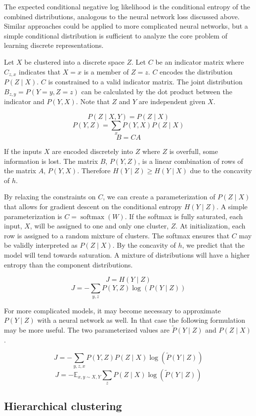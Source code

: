 \documentclass[11pt,letterpaper]{article}
\begin{document}
The expected conditional negative log likelihood is the conditional entropy of the combined distributions, analogous to the neural network loss discussed above. Similar approaches could be applied to more complicated neural networks, but a simple conditional distribution is sufficient to analyze the core problem of learning discrete representations.

Let $X$ be clustered into a discrete space $Z$. Let $C$ be an indicator matrix where $C_{z,x}$ indicates that $X=x$ is a member of $Z=z$. $C$ encodes the distribution $P(Z \mid X)$. $C$ is constrained to a valid indicator matrix. The joint distribution $B_{z,y}=P(Y=y,Z=z)$ can be calculated by the dot product between the indicator and $P(Y,X)$. Note that $Z$ and $Y$ are independent given $X$.

$$P(Z \mid X,Y) = P(Z \mid X)$$
$$P(Y,Z) = \sum_x P(Y,X) P(Z \mid X)$$
$$B = C A $$ 

If the inputs $X$ are encoded discretely into $Z$ where $Z$ is overfull, some information is lost.  The matrix $B$, $P(Y,Z)$, is a linear combination of rows of the matrix $A$, $P(Y,X)$. Therefore $H(Y \mid Z) \ge H(Y \mid X)$ due to the concavity of $h$. 

By relaxing the constraints on $C$, we can create a parameterization of $P(Z \mid X)$ that allows for gradient descent on the conditional entropy $H(Y\mid Z)$. A simple parameterization
is $C=\operatorname{softmax}(W)$. If the softmax is fully saturated, each input, $X$, will be assigned to one and only one cluster, $Z$. At initialization, each row is assigned to a random mixture of clusters. The softmax ensures that $C$ may be validly interpreted as $P(Z \mid X)$. By the concavity of $h$, we predict that the model will tend towards saturation. A mixture of distributions will have a higher entropy than the component distributions.

$$ J = H(Y \mid Z) $$
$$ J = - \sum_{y,z} P(Y, Z) \log( P(Y \mid Z)) $$

For more complicated models, it may become necessary to approximate $P(Y \mid Z)$ with a neural network as well. In that case the following formulation may be more useful. The two parameterized values are $\tilde{P}(Y \mid Z)$ and $P(Z \mid X)$.

$$ J = - \sum_{y,z,x} P(Y, Z) P(Z \mid X) \log( \tilde{P}(Y \mid Z)) $$
$$ J = - \mathbb{E}_{x,y \sim X, Y} \sum_{z} P(Z \mid X) \log( \tilde{P}(Y \mid Z)) $$

\subsection{Hierarchical clustering}
\end{document}
